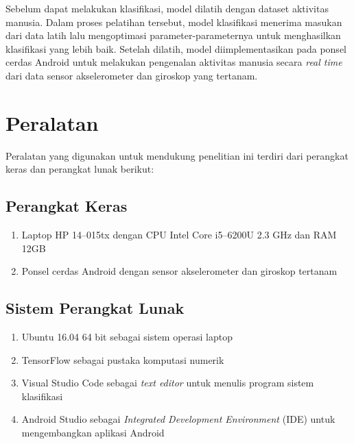 Sebelum dapat melakukan klasifikasi, model dilatih dengan dataset aktivitas manusia. Dalam proses pelatihan tersebut, model klasifikasi menerima masukan dari data latih lalu mengoptimasi parameter-parameternya untuk menghasilkan klasifikasi yang lebih baik. Setelah dilatih, model diimplementasikan pada ponsel cerdas Android untuk melakukan pengenalan aktivitas manusia secara \textit{real time} dari data sensor akselerometer dan giroskop yang tertanam.

\section{Peralatan}
Peralatan yang digunakan untuk mendukung penelitian ini terdiri dari perangkat keras dan perangkat lunak berikut:

\subsection{Perangkat Keras}
\begin{enumerate}
    \item Laptop HP 14--015tx dengan CPU Intel Core i5--6200U 2.3 GHz dan RAM 12GB
    \item Ponsel cerdas Android dengan sensor akselerometer dan giroskop tertanam
\end{enumerate}

\subsection{Sistem Perangkat Lunak}
\begin{enumerate}
    \item Ubuntu 16.04 64 bit sebagai sistem operasi laptop
    \item TensorFlow sebagai pustaka komputasi numerik
    \item Visual Studio Code sebagai \textit{text editor} untuk menulis program sistem klasifikasi
    \item Android Studio sebagai \textit{Integrated Development Environment} (IDE) untuk mengembangkan aplikasi Android
\end{enumerate}

